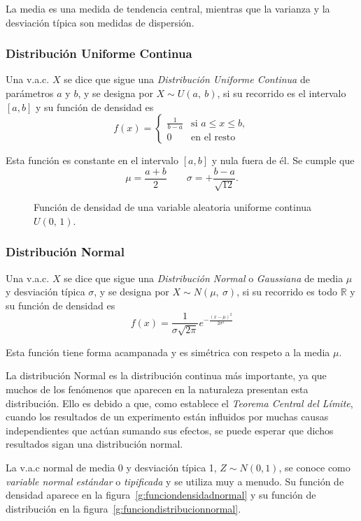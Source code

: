 La media es una medida de tendencia central, mientras que la varianza y la desviación típica son medidas de dispersión.


\subsubsection{Distribución Uniforme Continua}
Una v.a.c. $X$ se dice que sigue una \emph{Distribución Uniforme Continua} de parámetros $a$ y $b$, y se designa por
$X\sim U(a,\ b)$, si su recorrido es el intervalo $[a,b]$ y su función de densidad es
\[ 
f(x) =
\begin{cases}
\frac{1}{b-a} & \mbox{si $a\leq x\leq b$},\\
0 & \mbox{en el resto}
\end{cases}
\]

Esta función es constante en el intervalo $[a,b]$ y nula fuera de él. 
Se cumple que
\[
\mu=\frac{a+b}{2} \qquad \sigma=+\frac{b-a}{\sqrt{12}}.
\]

\begin{figure}[h!]
\centering
\scalebox{0.8}{} 
\caption{Función de densidad de una variable aleatoria uniforme continua $U(0,\,1)$.}
\label{g:uniforme}
\end{figure}


\subsubsection{Distribución Normal}
Una v.a.c. $X$ se dice que sigue una \emph{Distribución Normal} o \emph{Gaussiana} de media $\mu$ y desviación típica
$\sigma$, y se designa por $X\sim N(\mu,\ \sigma)$, si su recorrido es todo $\mathbb{R}$ y su función de densidad es
\[
f(x) = \frac{1}{{\sigma \sqrt {2\pi } }}e^{ - \frac{{(x - \mu )^2 }}{{2\sigma ^2 }}}
\]

Esta función tiene forma acampanada y es simétrica con respeto a la media $\mu$.

La distribución Normal es la distribución continua más importante, ya que muchos de los fenómenos que aparecen en la
naturaleza presentan esta distribución.
Ello es debido a que, como establece el \emph{Teorema Central del Límite}, cuando los resultados de un experimento están
influidos por muchas causas independientes que actúan sumando sus efectos, se puede esperar que dichos resultados sigan
una distribución normal.

La v.a.c normal de media 0 y desviación típica 1, $Z\sim N(0,1)$, se conoce como \emph{variable normal estándar} o
\emph{tipificada} y se utiliza muy a menudo.
Su función de densidad aparece en la figura~\ref{g:funciondensidadnormal} y su función de distribución en la
figura~\ref{g:funciondistribucionnormal}.

